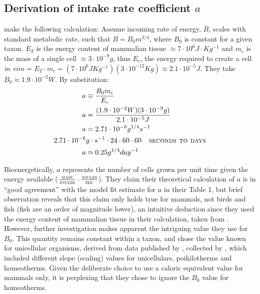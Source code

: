 \documentclass[a4paper]{article} %
\begin{document}
\subsection{Derivation of intake rate coefficient $a$}
\textcite{West2001} make the following calculation: Assume incoming rate of energy, $B$, scales with standard metabolic rate, such that $B = B_{0}m^{3/4}$, where $B_0$ is constant for a given taxon. $E_T$ is the energy content of mammalian tissue $\approx 7 \cdot 10^6 J \cdot Kg^{-1}$ and $m_c$ is the mass of a single cell $\approx 3 \cdot 10^{-9} g$, thus $E_c$, the energy required to create a cell \textit{in viro} = $E_T \cdot m_c = (7 \cdot 10^6 JKg^{-1})(3 \cdot 10^{-12} Kg) \approx 2.1 \cdot 10^{-5} J$. They take  $B_0 \approx 1.9 \cdot 10^{-2} W$. By substitution:
\begin{align*}
    a &\equiv \frac{B_{0}m_{c}}{E_{c}} \\
    a &= \frac{(1.9 \cdot 10^{-2} W)(3 \cdot 10^{-9} g)}{2.1 \cdot 10^{-5} J}\\
    a &= 2.71 \cdot 10^{-6} g^{1/4}s^{-1} \\
    2.71 \cdot 10^{-6}&g\cdot s^{-1} \cdot 24 \cdot 60 \cdot 60 \ \ \textsc{   seconds to days}\\
    a &\approx 0.25 g^{1/4}day^{-1}
\end{align*}

Bioenergetically, $a$ represents the number of cells grown per unit time given the energy available ($\frac{\textsc{mass}}{\textsc{joules}} \cdot \frac{\textsc{joules}}{\textsc{sec}}$). They claim their theoretical calculation of $a$ is in ``good agreement'' with the model fit estimate for $a$ in their Table 1, but brief observation reveals that this claim only holds true for mammals, not birds and fish (fish are an order of magnitude lower), an intuitive deduction since they used the energy content of mammalian tissue in their calculation, taken from \textcite{peters1983}. However, further investigation makes apparent the intriguing value they use for $B_0$. This quantity remains constant within a taxon, and \textcite{West2001} chose the value known for unicellular organisms, derived from data published by \textcite{Hemmingsen1960}, collected by \textcite{peters1983}, which included different slope (scaling) values for unicellulars, poikilotherms and homeotherms. Given the deliberate choice to use a caloric equivalent value for mammals only, it is perplexing that they chose to ignore the $B_0$ value for homeotherms.
\end{document}
